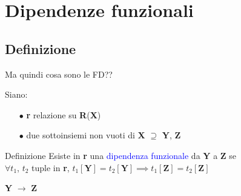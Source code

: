 \documentclass{beamer}
\begin{document}
\section{Dipendenze funzionali}


\subsection{Definizione}
\begin{frame}{Ma quindi cosa sono le FD??}

    Siano:
    \begin{itemize}
        \item[$\bullet$] \textbf{r} relazione su \textbf{R}(\textbf{X})
        \item[$\bullet$] due sottoinsiemi non vuoti di \textbf{X} $\supseteq$ \textbf{Y}, \textbf{Z}
    \end{itemize}
    
    

    \begin{block}{Definizione}
        Esiste in \textbf{r} una \textcolor{blue}{dipendenza funzionale} da \textbf{Y} a \textbf{Z} se \\
        \centering
        $\forall t_1$, $t_2$ tuple in \textbf{r}, $t_1[\textbf{Y}] = t_2[\textbf{Y}]\implies t_1[\textbf{Z}] = t_2[\textbf{Z}]$
    \end{block}

    \vfill
    \begin{center}
        \Huge
        \textbf{Y} $\rightarrow$ \textbf{Z}
    \end{center}
    \vfill
    
    
\end{frame}
\end{document}
